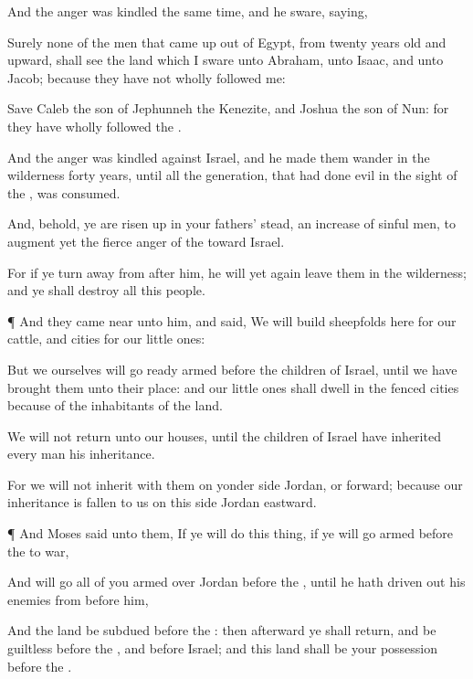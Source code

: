 {And the
{}
anger was
kindled the same
time, and he
sware,
saying,

Surely none of the
men that came
up out of
Egypt, from
twenty
years
old and
upward, shall
see the
land which I
sware unto
Abraham, unto
Isaac, and unto
Jacob; because they have not
wholly
followed me:

Save
Caleb the
son of
Jephunneh the
Kenezite, and
Joshua the
son of
Nun: for they have
wholly
followed the
{}.

And the
{}
anger was
kindled against
Israel, and he made them
wander in the
wilderness
forty
years, until all the
generation, that had
done
evil in the
sight of the
{}, was
consumed.

And, behold, ye are risen
up in your
fathers’ stead, an
increase of
sinful
men, to
augment yet the
fierce
anger of the
{} toward
Israel.

For if ye turn
away from
after him, he will yet
again
leave them in the
wilderness; and ye shall
destroy all this
people.


\par }{\PP {}¶ And they came
near unto him, and
said, We will
build
sheepfolds here for our
cattle, and
cities for our little
ones:

But we
ourselves will go
ready
armed
before the
children of
Israel, until we have
brought them unto their
place: and our little
ones shall
dwell in the
fenced
cities
because of the
inhabitants of the
land.

We will not
return unto our
houses, until the
children of
Israel have
inherited every
man his
inheritance.

For we will not
inherit with them on yonder
side
Jordan, or
forward; because our
inheritance is
fallen to us on this
side
Jordan
eastward.


\par }{\PP {}¶ And
Moses
said unto them, If ye will
do this
thing, if ye will go
armed
before the
{} to
war,

And will
go all of you
armed
over
Jordan
before the
{}, until he hath driven
out his
enemies from
before him,

And the
land be
subdued
before the
{}: then
afterward ye shall
return, and be
guiltless before the
{}, and before
Israel; and this
land shall be your
possession
before the
{}.

}
